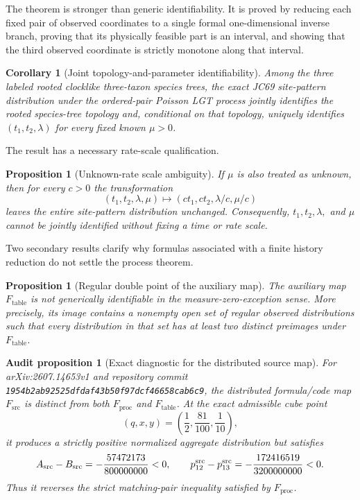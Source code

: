 \documentclass[11pt]{article}
\newtheorem{proposition}[theorem]{Proposition}
\newtheorem{corollary}[theorem]{Corollary}
\newtheorem{audit}[theorem]{Audit proposition}
\newcommand{\Proc}{F_{\mathrm{proc}}}
\newcommand{\Table}{F_{\mathrm{table}}}
\newcommand{\Src}{F_{\mathrm{src}}}
\begin{document}
The theorem is stronger than generic identifiability.  It is proved by reducing each fixed pair of observed coordinates to a single formal one-dimensional inverse branch, proving that its physically feasible part is an interval, and showing that the third observed coordinate is strictly monotone along that interval.

\begin{corollary}[Joint topology-and-parameter identifiability]\label{cor:topology}
Among the three labeled rooted clocklike three-taxon species trees, the exact JC69 site-pattern distribution under the ordered-pair Poisson LGT process jointly identifies the rooted species-tree topology and, conditional on that topology, uniquely identifies $(t_1,t_2,\lambda)$ for every fixed known $\mu>0$.
\end{corollary}

The result has a necessary rate-scale qualification.

\begin{proposition}[Unknown-rate scale ambiguity]\label{prop:scale}
If $\mu$ is also treated as unknown, then for every $c>0$ the transformation
\[
(t_1,t_2,\lambda,\mu)
\longmapsto
(ct_1,ct_2,\lambda/c,\mu/c)
\]
leaves the entire site-pattern distribution unchanged.  Consequently, $t_1,t_2,\lambda,$ and $\mu$ cannot be jointly identified without fixing a time or rate scale.
\end{proposition}

Two secondary results clarify why formulas associated with a finite history reduction do not settle the process theorem.

\begin{proposition}[Regular double point of the auxiliary map]\label{prop:table}
The auxiliary map $\Table$ is not generically identifiable in the measure-zero-exception sense.  More precisely, its image contains a nonempty open set of regular observed distributions such that every distribution in that set has at least two distinct preimages under $\Table$.
\end{proposition}

\begin{audit}[Exact diagnostic for the distributed source map]\label{prop:source}
For arXiv:2607.14653v1 and repository commit \texttt{1954b2ab92525dfdaf43b50f97dcf46658cab6c9}, the distributed formula/code map $\Src$ is distinct from both $\Proc$ and $\Table$.  At the exact admissible cube point
\[
(q,x,y)=\left(\frac12,\frac{81}{100},\frac1{10}\right),
\]
it produces a strictly positive normalized aggregate distribution but satisfies
\[
A_{\rm src}-B_{\rm src}=-\frac{57472173}{800000000}<0,
\qquad
p_{12}^{\rm src}-p_{13}^{\rm src}
=-\frac{172416519}{3200000000}<0.
\]
Thus it reverses the strict matching-pair inequality satisfied by $\Proc$.
\end{audit}
\end{document}
